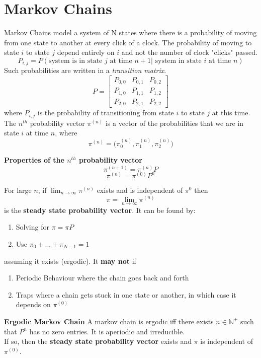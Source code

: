 \documentclass[10pt,a4paper]{article}
\begin{document}
\section{Markov Chains}
Markov Chains model a system of N states where there is a probability of moving from one state to another at every click of a clock. The probability of moving to state  $i$ to state $j$ depend entirely on $i$ and not the number of clock "clicks" passed. $$P_{i,j} = P(\text{system is in state } j \text{ at time } n+1| \text{ system in state } i \text{ at time } n)$$ Such probabilities are written in a \emph{transition matrix}. $$P = \begin{bmatrix}
    P_{0,0} & P_{0,1} & P_{0,2} \\
    P_{1,0} & P_{1,1} & P_{1,2} \\
    P_{2,0} & P_{2,1} & P_{2,2}
\end{bmatrix}$$ where $P_{i,j}$ is the probability of transitioning from state $i$ to state $j$ at this time.\\
The $n^{th}$ probability vector $\pi^{(n)}$ is a vector of the probabilities that we are in state $i$ at time $n$, where $$\pi^{(n)} = \big(\pi^{(n)}_{0},\pi^{(n)}_{1},\pi^{(n)}_{2}\big)$$
\begin{framed}
	\centering\textbf{Properties of the $n^{th}$ probability vector}
	$$\pi^{(n+1)} = \pi^{(n)}P $$
	$$\pi^{(n)} = \pi^{(0)}P^{n}$$
\end{framed}
For large $n$, if $\lim_{n \to\infty}\pi^{(n)}$ exists and is independent of $\pi^{0}$ then $$\pi = \lim_{n \to \infty} \pi^{(n)}$$ is the \textbf{steady state probability vector}. It can be found by:
\begin{enumerate}
\item Solving for $\pi = \pi P$ 
\item Use $\pi_{0} + ... + \pi_{N-1} = 1$
\end{enumerate} assuming it exists (ergodic). It \textbf{may not} if
\begin{enumerate}
\item Periodic Behaviour where the chain goes back and forth
\item Traps where a chain gets stuck in one state or another, in which case it depends on $\pi^{(0)}$
\end{enumerate}
\begin{framed}
	\centering\textbf{Ergodic Markov Chain}
	A markov chain is ergodic iff there exists $n \in \mathbb{N}^{+}$ such that $P^{n}$ has no zero entries. It is aperiodic and irreducible. \\
	If so, then the \textbf{steady state probability vector} exists and $\pi$ is independent of $\pi^{(0)}$.
\end{framed}
\newpage 
\end{document}
